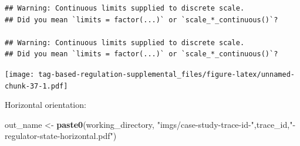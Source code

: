 \documentclass[
]{book}
\newenvironment{Shaded}{\begin{snugshade}}{\end{snugshade}}
\newcommand{\KeywordTok}[1]{\textcolor[rgb]{0.13,0.29,0.53}{\textbf{#1}}}
\newcommand{\NormalTok}[1]{#1}
\newcommand{\StringTok}[1]{\textcolor[rgb]{0.31,0.60,0.02}{#1}}
\begin{document}
\begin{verbatim}
## Warning: Continuous limits supplied to discrete scale.
## Did you mean `limits = factor(...)` or `scale_*_continuous()`?

## Warning: Continuous limits supplied to discrete scale.
## Did you mean `limits = factor(...)` or `scale_*_continuous()`?
\end{verbatim}

\texttt{[image: tag-based-regulation-supplemental\_files/figure-latex/unnamed-chunk-37-1.pdf]}

Horizontal orientation:

\begin{Shaded}
\begin{Highlighting}[]
\NormalTok{out\_name \textless{}{-}}\StringTok{ }\KeywordTok{paste0}\NormalTok{(working\_directory, }\StringTok{"imgs/case{-}study{-}trace{-}id{-}"}\NormalTok{,trace\_id,}\StringTok{"{-}regulator{-}state{-}horizontal.pdf"}\NormalTok{)}


\end{Highlighting}
\end{Shaded}
\end{document}
